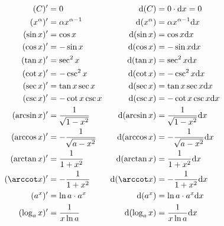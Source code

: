 \documentclass[zihao=-4,linespread=1.8,UTF8,nothm]{aytony_base}
\theoremstyle{definition}
\begin{document}
\begin{appendices}
    $$
        \begin{aligned}
            (C)'           & = 0                                  & \mathrm{d}(C)           & = 0 \cdot \mathrm{d}x = 0                                \\
            (x^\alpha)'    & = \alpha x^{\alpha - 1}              & \mathrm{d}(x^\alpha)    & = \alpha x^{\alpha - 1}\mathrm{d}x                       \\
            (\sin x)'      & = \cos x                             & \mathrm{d}(\sin x)      & = \cos x          \mathrm{d}x                            \\
            (\cos x)'      & = -\sin x                            & \mathrm{d}(\cos x)      & = -\sin x               \mathrm{d}x                      \\
            (\tan x)'      & = \sec^2 x                           & \mathrm{d}(\tan x)      & = \sec^2 x                  \mathrm{d}x                  \\
            (\cot x)'      & = -\csc^2 x                          & \mathrm{d}(\cot x)      & = -\csc^2 x                  \mathrm{d}x                 \\
            (\sec x)'      & = \tan x\sec x                       & \mathrm{d}(\sec x)      & = \tan x\sec x                   \mathrm{d}x             \\
            (\csc x)'      & = -\cot x\csc x                      & \mathrm{d}(\csc x)      & = -\cot x\csc x         \mathrm{d}x                      \\
            (\arcsin x)'   & = \dfrac{1}{\,\sqrt[]{1-x^2}}        & \mathrm{d}(\arcsin x)   & = \dfrac{1}{\,\sqrt[]{1-x^2}}     \mathrm{d}x            \\
            (\arccos x)'   & = -\dfrac{1}{\,\sqrt[]{a-x^2}}       & \mathrm{d}(\arccos x)   & = -\dfrac{1}{\,\sqrt[]{a-x^2}}      \mathrm{d}x          \\
            (\arctan x)'   & = \dfrac{1}{1+x^2}                   & \mathrm{d}(\arctan x)   & = \dfrac{1}{1+x^2}                  \mathrm{d}x          \\
            (\arccot x)'   & = -\dfrac{1}{1+x^2}                  & \mathrm{d}(\arccot x)   & = -\dfrac{1}{1+x^2}                 \mathrm{d}x          \\
            (a^x)'         & = \ln a \cdot a^x                    & \mathrm{d}(a^x)         & = \ln a \cdot a^x                \mathrm{d}x             \\
            (\log_a x)'    & = \dfrac{1}{x\ln a}                  & \mathrm{d}(\log_a x)    & = \dfrac{1}{x\ln a}                 \mathrm{d}x          \\

\end{aligned}$$
\end{appendices}
\end{document}
